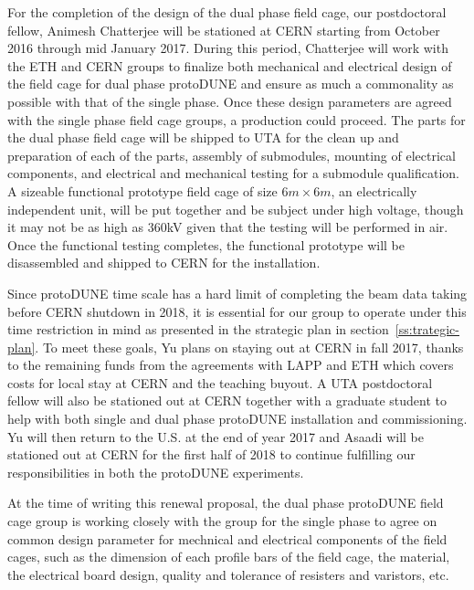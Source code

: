 For the completion of the design of the dual phase field cage, our postdoctoral fellow, Animesh Chatterjee will be stationed at CERN starting from October 2016 through mid January 2017.   During this period, Chatterjee will work with the ETH and CERN groups to finalize both mechanical and electrical design of the field cage for dual phase protoDUNE and ensure as much a commonality as possible with that of the single phase.  Once these design parameters are agreed with the single phase field cage groups, a production could proceed.  The parts for the dual phase field cage will be shipped to UTA for the clean up and preparation of each of the parts, assembly of submodules, mounting of electrical components, and electrical and mechanical testing for a submodule qualification. A sizeable functional prototype field cage of size $6m\times 6m$, an electrically independent unit, will be put together and be subject under high voltage, though it may not be as high as 360kV given that the testing will be performed in air.  Once the functional testing completes, the functional prototype will be disassembled and shipped to CERN for the installation.

Since protoDUNE time scale has a hard limit of completing the beam data taking before CERN shutdown in 2018, it is essential for our group to operate under this time restriction in mind as presented in the strategic plan in section~\ref{ss:trategic-plan}.  To meet these goals, Yu plans on staying out at CERN in fall 2017, thanks to the remaining funds from the agreements with LAPP and ETH which covers costs for local stay at CERN and the teaching buyout.   A UTA postdoctoral fellow will also be stationed out at CERN together with a graduate student to help with both single and dual phase protoDUNE installation and commissioning.   Yu will then return to the U.S. at the end of year 2017 and Asaadi will be stationed out at CERN for the first half of 2018 to continue fulfilling our responsibilities in both the protoDUNE experiments.

At the time of writing this renewal proposal, the dual phase protoDUNE field cage group is working closely with the group for the single phase to agree on common design parameter for mechnical and electrical components of the field cages, such as the dimension of each profile bars of the field cage, the material, the electrical board design, quality and tolerance of resisters and varistors, etc. 
